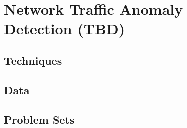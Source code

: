 
\chapter{Network Traffic Anomaly Detection (TBD)}

\section{Techniques}

\section{Data}

\section{Problem Sets}
